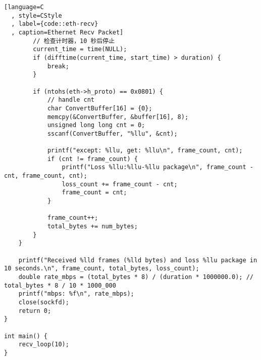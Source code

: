 \begin{lstlisting}[language=C
  , style=CStyle
  , label={code::eth-recv}
  , caption=Ethernet Recv Packet]
        // 检查计时器，10 秒后停止
        current_time = time(NULL);
        if (difftime(current_time, start_time) > duration) {
            break;
        }

        if (ntohs(eth->h_proto) == 0x0801) {
            // handle cnt
            char ConvertBuffer[16] = {0};
            memcpy(&ConvertBuffer, &buffer[16], 8);
            unsigned long long cnt = 0;
            sscanf(ConvertBuffer, "%llu", &cnt);

            printf("except: %llu, get: %llu\n", frame_count, cnt);
            if (cnt != frame_count) {
                printf("Loss %llu:%llu-%llu package\n", frame_count - cnt, frame_count, cnt);
                loss_count += frame_count - cnt;
                frame_count = cnt;
            }

            frame_count++;
            total_bytes += num_bytes;
        }
    }

    printf("Received %lld frames (%lld bytes) and loss %llu package in 10 seconds.\n", frame_count, total_bytes, loss_count);
    double rate_mbps = (total_bytes * 8) / (duration * 1000000.0); // total_bytes * 8 / 10 * 1000_000
    printf("mbps: %f\n", rate_mbps);
    close(sockfd);
    return 0;
}

int main() {
    recv_loop(10);
}  
\end{lstlisting}
